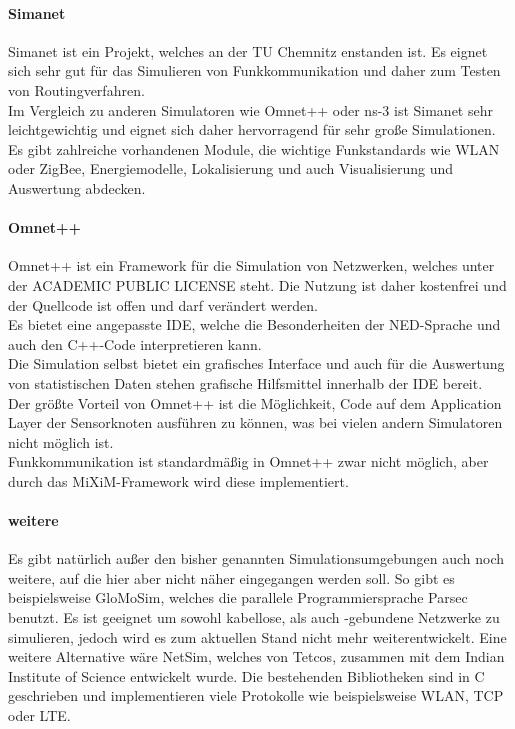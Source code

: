 \paragraph{Simanet\cite{simanet}}

Simanet ist ein Projekt, welches an der TU Chemnitz enstanden ist. Es eignet sich sehr gut für das Simulieren von Funkkommunikation und daher zum Testen von Routingverfahren.\\
Im Vergleich zu anderen Simulatoren wie Omnet++ oder ns-3 ist Simanet sehr leichtgewichtig und eignet sich daher hervorragend für sehr große Simulationen.\\
Es gibt zahlreiche vorhandenen Module, die wichtige Funkstandards wie WLAN oder ZigBee, Energiemodelle, Lokalisierung und auch Visualisierung und Auswertung abdecken.

\paragraph{Omnet++\cite{omnet}}

Omnet++ ist ein Framework für die Simulation von Netzwerken, welches unter der ACADEMIC PUBLIC LICENSE steht. Die Nutzung ist daher kostenfrei und der Quellcode ist offen und darf verändert werden.\\
Es bietet eine angepasste IDE, welche die Besonderheiten der NED-Sprache und auch den C++-Code interpretieren kann.\\Die Simulation selbst bietet ein grafisches Interface und auch für die Auswertung von statistischen Daten stehen grafische Hilfsmittel innerhalb der IDE bereit.\\
Der größte Vorteil von Omnet++ ist die Möglichkeit, Code auf dem Application Layer der Sensorknoten ausführen zu können, was bei vielen andern Simulatoren nicht möglich ist.\\
Funkkommunikation ist standardmäßig in Omnet++ zwar nicht möglich, aber durch das MiXiM-Framework wird diese implementiert.

\paragraph{weitere}

Es gibt natürlich außer den bisher genannten Simulationsumgebungen auch noch weitere, auf die hier aber nicht näher eingegangen werden soll. So gibt es beispielsweise GloMoSim, welches die parallele Programmiersprache Parsec benutzt. Es ist geeignet um sowohl kabellose, als auch -gebundene Netzwerke zu simulieren, jedoch wird es zum aktuellen Stand nicht mehr weiterentwickelt. \newline
Eine weitere Alternative wäre NetSim, welches von Tetcos, zusammen mit dem Indian Institute of Science entwickelt wurde. Die bestehenden Bibliotheken sind in C geschrieben und implementieren viele Protokolle wie beispielsweise WLAN, TCP oder LTE.

